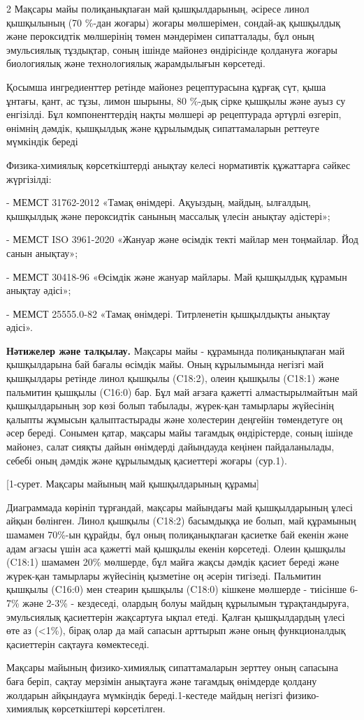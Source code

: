 \begin{multicols}{2}
Мақсары майы полиқанықпаған май қышқылдарының, әсіресе линол қышқылының
(70 \%-дан жоғары) жоғары мөлшерімен, сондай-ақ қышқылдық және
пероксидтік мөлшерінің төмен мәндерімен сипатталады, бұл оның
эмульсиялық тұздықтар, соның ішінде майонез өндірісінде қолдануға жоғары
биологиялық және технологиялық жарамдылығын көрсетеді.

Қосымша ингредиенттер ретінде майонез рецептурасына құрғақ сүт, қыша
ұнтағы, қант, ас тұзы, лимон шырыны, 80 \%-дық сірке қышқылы және ауыз
су енгізілді. Бұл компоненттердің нақты мөлшері әр рецептурада әртүрлі
өзгеріп, өнімнің дәмдік, қышқылдық және құрылымдық сипаттамаларын
реттеуге мүмкіндік береді

Физика-химиялық көрсеткіштерді анықтау келесі нормативтік құжаттарға
сәйкес жүргізілді:

- МЕМСТ 31762-2012 «Тамақ өнімдері. Ақуыздың, майдың, ылғалдың,
қышқылдық және пероксидтік санының массалық үлесін анықтау әдістері»;

- МЕМСТ ISO 3961-2020 «Жануар және өсімдік текті майлар мен тоңмайлар.
Йод санын анықтау»;

- МЕМСТ 30418-96 «Өсімдік және жануар майлары. Май қышқылдық құрамын
анықтау әдісі»;

- МЕМСТ 25555.0-82 «Тамақ өнімдері. Титрленетін қышқылдықты анықтау
әдісі».

{\bfseries Нәтижелер және талқылау.} Мақсары майы - құрамында
полиқанықпаған май қышқылдарына бай бағалы өсімдік майы. Оның
кұрылымында негізгі май қышқылдары ретінде линол қышқылы (C18:2), олеин
қышқылы (C18:1) және пальмитин қышқылы (C16:0) бар. Бұл май ағзаға
қажетті алмастырылмайтын май қышқылдарының зор көзі болып табылады,
жүрек-қан тамырлары жүйесінің қалыпты жұмысын қалыптастырады және
холестерин деңгейін төмендетуге оң әсер береді. Сонымен қатар, мақсары
майы тағамдық өндірістерде, соның ішінде майонез, салат сияқты дайын
өнімдерді дайындауда кеңінен пайдаланылады, себебі оның дәмдік және
құрылымдық қасиеттері жоғары (сур.1).

[1-сурет. Мақсары майының май қышқылдарының құрамы]

Диаграммада көрініп тұрғандай, мақсары майындағы май қышқылдарының ұлесі
айқын бөлінген. Линол қышқылы (C18:2) басымдыққа ие болып, май құрамының
шамамен 70\%-ын құрайды, бұл оның полиқанықпаған қасиетке бай екенін
және адам ағзасы үшін аса қажетті май қышқылы екенін көрсетеді. Олеин
қышқылы (C18:1) шамамен 20\% мөлшерде, бұл майға жақсы дәмдік қасиет
береді және жүрек-қан тамырлары жүйесінің қызметіне оң әсерін тигізеді.
Пальмитин қышқылы (C16:0) мен стеарин қышқылы (C18:0) кішкене мөлшерде -
тиісінше 6-7\% және 2-3\% - кездеседі, олардың болуы майдың құрылымын
тұрақтандыруға, эмульсиялық қасиеттерін жақсартуға ықпал етеді. Қалған
қышқылдардың үлесі өте аз (<1\%), бірақ олар да май сапасын
арттырып және оның функционалдық қасиеттерін сақтауға көмектеседі.

Мақсары майының физико-химиялық сипаттамаларын зерттеу оның сапасына
баға беріп, сақтау мерзімін анықтауға және тағамдық өнімдерде қолдану
жолдарын айқындауға мүмкіндік береді.1-кестеде майдың негізгі
физико-химиялық көрсеткіштері көрсетілген.
\end{multicols}

